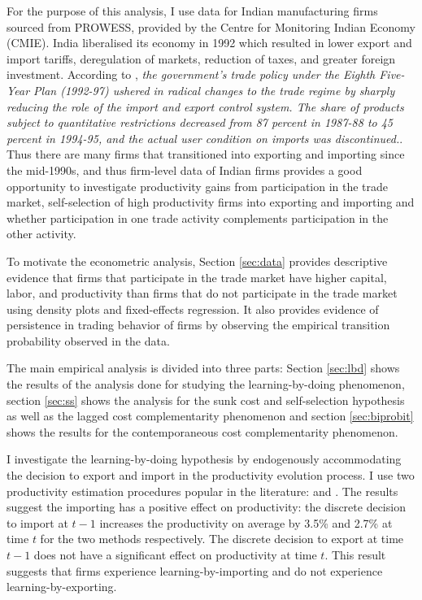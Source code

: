 \documentclass[12pt]{article}
\begin{document}
For the purpose of this analysis, I use data for Indian manufacturing
firms sourced from PROWESS, provided by the Centre for Monitoring
Indian Economy (CMIE). India liberalised its economy in
1992 which resulted in lower export and import
tariffs, deregulation of markets, reduction of taxes, and greater 
foreign investment. According to \textcite{topalova2011trade}, \textit{the government's trade policy under the Eighth Five-Year Plan (1992-97) ushered
in radical changes to the trade regime by sharply reducing the role of
the import and export control system. The share of products subject to quantitative restrictions
decreased from 87 percent in 1987-88 to 45 percent in 1994-95, and the actual user
condition on imports was discontinued.}. Thus there are many firms
that transitioned into exporting and importing since the mid-1990s, and thus
firm-level data of Indian firms provides a good opportunity to
investigate  productivity gains from participation in
the trade market, self-selection of high productivity firms into
exporting and importing and 
whether participation in one trade activity complements participation
in the other activity.

To motivate the econometric analysis, Section \ref{sec:data} provides descriptive evidence that firms that
participate in the trade market have higher capital, labor, and
productivity than firms that do not participate in the trade
market using density plots and fixed-effects regression. It also provides evidence of persistence in trading
behavior of firms by observing the empirical transition probability observed in
the data. 

The main empirical analysis is divided into three parts: Section
\ref{sec:lbd} shows the results of the analysis done for studying the
learning-by-doing phenomenon, section \ref{sec:ss} shows the
analysis for the sunk cost and
self-selection hypothesis as well as the lagged cost complementarity
phenomenon and section \ref{sec:biprobit} shows the results for the
contemporaneous cost complementarity phenomenon.

I investigate the learning-by-doing hypothesis by endogenously
accommodating the decision to export and import in the
productivity evolution process. I use two productivity estimation
procedures popular in the literature:
\textcite{levinsohn2003estimating} and
\textcite{ackerberg2006structural}. The results suggest the importing
has a positive effect on productivity: the discrete decision to import
at $t-1$
increases the productivity on average by 3.5\% and 2.7\% at time $t$ for the two
methods respectively. The discrete decision to export at time $t-1$
does not have a significant effect on
productivity at time $t$. This result suggests that firms experience
learning-by-importing and do not experience learning-by-exporting. 
\end{document}
